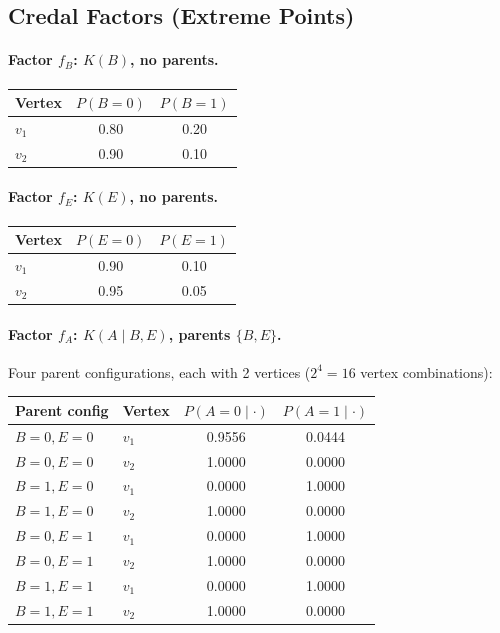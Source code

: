 \documentclass[11pt]{article}
\begin{document}
\subsection{Credal Factors (Extreme Points)}

\paragraph{Factor $f_B$: $K(B)$, no parents.}
\begin{center}
\begin{tabular}{lcc}
\toprule
\textbf{Vertex} & $P(B{=}0)$ & $P(B{=}1)$ \\
\midrule
$v_1$ & 0.80 & 0.20 \\
$v_2$ & 0.90 & 0.10 \\
\bottomrule
\end{tabular}
\end{center}

\paragraph{Factor $f_E$: $K(E)$, no parents.}
\begin{center}
\begin{tabular}{lcc}
\toprule
\textbf{Vertex} & $P(E{=}0)$ & $P(E{=}1)$ \\
\midrule
$v_1$ & 0.90 & 0.10 \\
$v_2$ & 0.95 & 0.05 \\
\bottomrule
\end{tabular}
\end{center}

\paragraph{Factor $f_A$: $K(A \mid B, E)$, parents $\{B, E\}$.}
Four parent configurations, each with 2 vertices ($2^4 = 16$ vertex combinations):
\begin{center}
\begin{tabular}{llcc}
\toprule
\textbf{Parent config} & \textbf{Vertex} & $P(A{=}0 \mid \cdot)$ & $P(A{=}1 \mid \cdot)$ \\
\midrule
$B{=}0, E{=}0$ & $v_1$ & 0.9556 & 0.0444 \\
$B{=}0, E{=}0$ & $v_2$ & 1.0000 & 0.0000 \\
\midrule
$B{=}1, E{=}0$ & $v_1$ & 0.0000 & 1.0000 \\
$B{=}1, E{=}0$ & $v_2$ & 1.0000 & 0.0000 \\
\midrule
$B{=}0, E{=}1$ & $v_1$ & 0.0000 & 1.0000 \\
$B{=}0, E{=}1$ & $v_2$ & 1.0000 & 0.0000 \\
\midrule
$B{=}1, E{=}1$ & $v_1$ & 0.0000 & 1.0000 \\
$B{=}1, E{=}1$ & $v_2$ & 1.0000 & 0.0000 \\
\bottomrule
\end{tabular}
\end{center}
\end{document}
